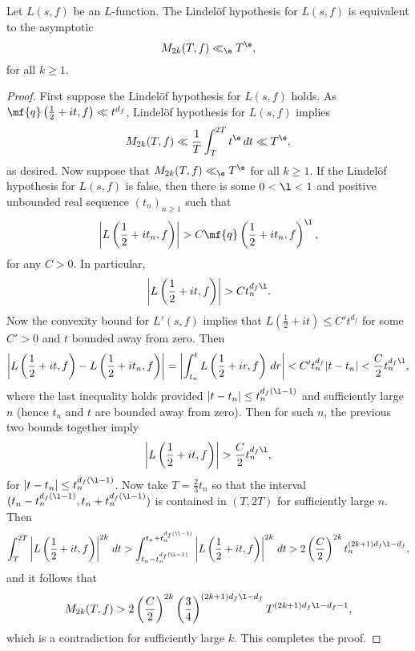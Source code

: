     \begin{proposition}\label{prop:equivalence_Lindelof_hypothesis_and_moments}
      Let $L(s,f)$ be an $L$-function. The Lindel\"of hypothesis for $L(s,f)$ is equivalent to the asymptotic
      \[
        M_{2k}(T,f) \ll_{\e} T^{\e},
      \]
      for all $k \ge 1$.
    \end{proposition}
    \begin{proof}
      First suppose the Lindel\"of hypothesis for $L(s,f)$ holds. As $\mf{q}\left(\frac{1}{2}+it,f\right) \ll t^{d_{f}}$, Lindel\"of hypothesis for $L(s,f)$ implies
      \[
        M_{2k}(T,f) \ll \frac{1}{T}\int_{T}^{2T}t^{\e}\,dt \ll T^{\e},
      \]
      as desired. Now suppose that $M_{2k}(T,f) \ll_{\e} T^{\e}$ for all $k \ge 1$. If the Lindel\"of hypothesis for $L(s,f)$ is false, then there is some $0 < \l < 1$ and positive unbounded real sequence $(t_{n})_{n \ge 1}$ such that
      \[
        \left|L\left(\frac{1}{2}+it_{n},f\right)\right| > C\mf{q}\left(\frac{1}{2}+it_{n},f\right)^{\l},
      \]
      for any $C > 0$. In particular,
       \[
        \left|L\left(\frac{1}{2}+it,f\right)\right| > Ct_{n}^{d_{f}\l}.
      \]
      Now the convexity bound for $L'(s,f)$ implies that $L\left(\frac{1}{2}+it\right) \le C't^{d_{f}}$ for some $C' > 0$ and $t$ bounded away from zero. Then
      \[
        \left|L\left(\frac{1}{2}+it,f\right)-L\left(\frac{1}{2}+it_{n},f\right)\right| = \left|\int_{t_{n}}^{t}L\left(\frac{1}{2}+ir,f\right)\,dr\right| < C't_{n}^{d_{f}}|t-t_{n}| < \frac{C}{2}t_{n}^{d_{f}\l},
      \]
      where the last inequality holds provided $|t-t_{n}| \le t_{n}^{d_{f}(\l-1)}$ and sufficiently large $n$ (hence $t_{n}$ and $t$ are bounded away from zero). Then for such $n$, the previous two bounds together imply
      \[
        \left|L\left(\frac{1}{2}+it,f\right)\right| > \frac{C}{2}t_{n}^{d_{f}\l},
      \]
      for $|t-t_{n}| \le t_{n}^{d_{f}(\l-1)}$. Now take $T = \frac{2}{3}t_{n}$ so that the interval $(t_{n}-t_{n}^{d_{f}(\l-1)},t_{n}+t_{n}^{d_{f}(\l-1)})$ is contained in $\left(T,2T\right)$ for sufficiently large $n$. Then
      \[
        \int_{T}^{2T}\left|L\left(\frac{1}{2}+it,f\right)\right|^{2k}\,dt > \int_{t_{n}-t_{n}^{d_{f}(\l-1)}}^{t_{n}+t_{n}^{d_{f}(\l-1)}}\left|L\left(\frac{1}{2}+it,f\right)\right|^{2k}\,dt > 2\left(\frac{C}{2}\right)^{2k}t_{n}^{(2k+1)d_{f}\l-d_{f}},
      \]
      and it follows that
      \[
        M_{2k}(T,f) > 2\left(\frac{C}{2}\right)^{2k}\left(\frac{3}{4}\right)^{(2k+1)d_{f}\l-d_{f}}T^{(2k+1)d_{f}\l-d_{f}-1},
      \]
      which is a contradiction for sufficiently large $k$. This completes the proof.
    \end{proof}

